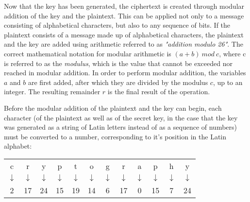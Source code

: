 \documentclass[12pt, a4paper]{report}
\theoremstyle{definition}
\theoremstyle{remark}
\begin{document}


Now that the key has been generated, the ciphertext is created through modular addition of the key and the plaintext. This can be applied not only to a message consisting of alphabetical characters, but also to any sequence of bits. If the plaintext consists of a message made up of alphabetical characters, the plaintext and the key are added using arithmetic referred to as \textit{"addition modulo 26"}. The correct mathematical notation for modular arithmetic is $(a+b)\:mod\:c$, where c is referred to as the \textit{modulus}, which is the value that cannot be exceeded nor reached in modular addition. In order to perform modular addition, the variables $a$ and $b$ are first added, after which they are divided by the modulus $c$, up to an integer. The resulting remainder $r$ is the final result of the operation.

Before the modular addition of the plaintext and the key can begin, each character (of the plaintext as well as of the secret key, in the case that the key was generated as a string of Latin letters instead of as a sequence of numbers) must be converted to a number, corresponding to it's position in the Latin alphabet:

\begin{center}
\begin{tabular}{cccccccccccc}
c & r & y & p & t & o & g & r & a & p & h & y \\
$\downarrow$ & $\downarrow$ & $\downarrow$ & $\downarrow$ & $\downarrow$ & $\downarrow$ & $\downarrow$ & $\downarrow$ & $\downarrow$ & $\downarrow$ & $\downarrow$ & $\downarrow$  \\
2 & 17 & 24 & 15 & 19 & 14 & 6 & 17 & 0 & 15 & 7 & 24 \\
\end{tabular}
\end{center}


\end{document}
